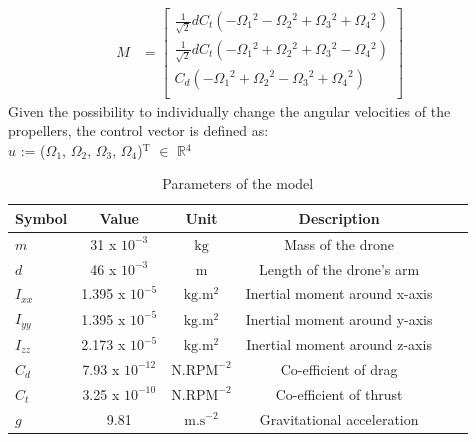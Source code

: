 \documentclass[conference]{IEEEtran}
\begin{document}
\begin{align*}
	M &=
	\begin{bmatrix}
		\frac{1}{\sqrt{2}}dC_t(-\Omega_1\mathrm{^{2}} - \Omega_2\mathrm{^{2}} + \Omega_3\mathrm{^{2}} + \Omega_4\mathrm{^{2}})\\
		\frac{1}{\sqrt{2}}dC_t(-\Omega_1\mathrm{^{2}} + \Omega_2\mathrm{^{2}} + \Omega_3\mathrm{^{2}} - \Omega_4\mathrm{^{2}})\\
		C_d(-\Omega_1\mathrm{^{2}} + \Omega_2\mathrm{^{2}} - \Omega_3\mathrm{^{2}} + \Omega_4\mathrm{^{2}})\\
	\end{bmatrix}
\end{align*}
Given the possibility to individually change the angular velocities of the propellers, the control vector is defined as: \\                          
$u$ := ($\Omega_{1}$, $\Omega_{2}$, $\Omega_{3}$, $\Omega_{4}$)$\mathrm{^{T}}$ $\in$ $\mathbb{R}\mathrm{^{4}}$

\begin{table}[htbp]\label{table1}
	\caption{Parameters of the model}
	\begin{center}
		\begin{tabular}{lccccl}\toprule
            \hline
			\textbf{Symbol} & \textbf{Value} & \textbf{Unit} & \textbf{Description}\\\midrule
			\hline
            $m$ & 31 x $\mathrm{10^{-3}}$ & $\mathrm{kg}$ & Mass of the drone \\
			$d$ & 46 x $\mathrm{10^{-3}}$ & $\mathrm{m}$ & Length of the drone's arm \\
			$I_{xx}$ & 1.395 x $\mathrm{10^{-5}}$ & $\mathrm{kg.m^2}$ & Inertial moment around x-axis \\
            $I_{yy}$ & 1.395 x $\mathrm{10^{-5}}$ & $\mathrm{kg.m^2}$ & Inertial moment around y-axis \\
            $I_{zz}$ & 2.173 x $\mathrm{10^{-5}}$ & $\mathrm{kg.m^2}$ & Inertial moment around z-axis \\
            $C_d$ & 7.93 x $\mathrm{10^{-12}}$ & $\mathrm{N.RPM^{-2}}$ & Co-efficient of drag\\
			$C_t$ & 3.25 x $\mathrm{10^{-10}}$ & $\mathrm{N.RPM^{-2}}$ & Co-efficient of thrust \\
			$g$ & 9.81 & $\mathrm{m.s^{-2}}$ & Gravitational acceleration \\\bottomrule
			\hline
		\end{tabular}
	\end{center}
\end{table}
\end{document}

